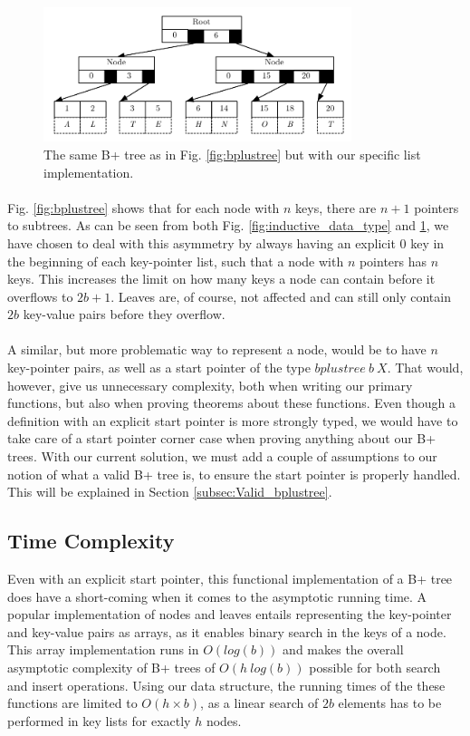 \begin{figure}
 \centering
   \includegraphics[width=90mm]{diagrams/BPlusTreeImpl.pdf}
 \caption{The same B+ tree as in Fig. \ref{fig:bplustree} but with our specific list implementation.}
 \label{fig:bplustreeImpl}
\end{figure}

\paragraph{}
Fig. \ref{fig:bplustree} shows that for each node with $n$ keys, there are $n+1$ pointers to subtrees. As can be seen from both Fig. \ref{fig:inductive_data_type} and \ref{fig:bplustreeImpl}, we have chosen to deal with this asymmetry by always having an explicit $0$ key in the beginning of each key-pointer list, such that a node with $n$ pointers has $n$ keys. This increases the limit on how many keys a node can contain before it overflows to $2b+1$. Leaves are, of course, not affected and can still only contain $2b$ key-value pairs before they overflow.
\paragraph{}
A similar, but more problematic way to represent a node, would be to have $n$ key-pointer pairs, as well as a start pointer of the type $bplustree~b~X$. That would, however, give us unnecessary complexity, both when writing our primary functions, but also when proving theorems about these functions. Even though a definition with an explicit start pointer is more strongly typed, we would have to take care of a start pointer corner case when proving anything about our B+ trees. With our current solution, we must add a couple of assumptions to our notion of what a valid B+ tree is, to ensure the start pointer is properly handled. This will be explained in Section \ref{subsec:Valid_bplustree}.

\subsection{Time Complexity}
Even with an explicit start pointer, this functional implementation of a B+ tree does have a short-coming when it comes to the asymptotic running time. A popular implementation of nodes and leaves entails representing the key-pointer and key-value pairs as arrays, as it enables binary search in the keys of a node. This array implementation runs in $O(log(b))$ and makes the overall asymptotic complexity of B+ trees of $O(h~log(b))$ possible for both search and insert operations. Using our data structure, the running times of the these functions are limited to $O(h\times b)$, as a linear search of $2b$ elements has to be performed in key lists for exactly $h$ nodes. 
